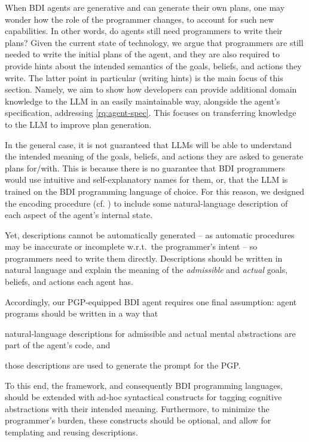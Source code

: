 When \ac{BDI} agents are generative and can generate their own plans,
one may wonder how the role of the programmer changes, to account for such new capabilities.
%
In other words, do agents still need programmers to write their plans?
%
Given the current state of technology,
we argue that %
programmers are still needed to write the initial plans of the agent,
and they are also required to provide hints about the intended semantics of the goals, beliefs, and actions they write.
%
The latter point in particular (writing hints) is the main focus of this section.
Namely, we aim to show how developers can provide additional domain knowledge to the \ac{LLM} in an easily maintainable way, alongside the agent's specification, addressing \ref{rq:agent-spec}.
This focuses on transferring knowledge to the \ac{LLM} to improve plan generation.

In the general case,
it is not guaranteed that \acp{LLM} will be able to understand the intended meaning of the goals, beliefs, and actions
they are asked to generate plans for/with.
%
This is because there is no guarantee that \ac{BDI} programmers would use intuitive and self-explanatory names for them,
or, that the \ac{LLM} is trained on the \ac{BDI} programming language of choice.
%
For this reason,
we designed the encoding procedure (cf. ) to include some natural-language
description of each aspect of the agent's internal state.

Yet,
descriptions cannot be automatically generated
-- as automatic procedures may be inaccurate or incomplete w.r.t.\ the programmer's intent --
so programmers need to write them directly.
%
Descriptions should be written in natural language and explain the meaning of
the \emph{admissible} and \emph{actual} goals, beliefs, and actions each agent has.

Accordingly,
our \ac{PGP}-equipped \ac{BDI} agent requires one final assumption:
agent programs should be written in a way that
\begin{inlinelist}
    \item natural-language descriptions for admissible and actual mental abstractions are part of the agent's code,
    and
    \item those descriptions are used to generate the prompt for the \ac{PGP}.
\end{inlinelist}
%
To this end,
the \agentspeak{} framework, and consequently \ac{BDI} programming languages, should be extended with ad-hoc syntactical constructs for
tagging cognitive abstractions with their intended meaning.
%
Furthermore,
to minimize the programmer's burden,
these constructs should be optional,
and allow for templating and reusing descriptions.

